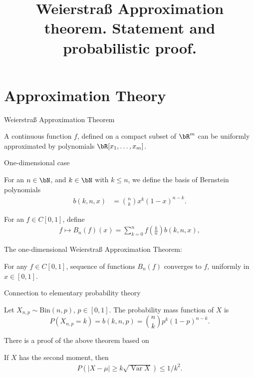 \title{Weierstraß Approximation theorem. Statement and probabilistic proof.}

{
    \begin{frame}
        \titlepage
    \end{frame}
    \addtocounter{framenumber}{-1}
}

\section{Approximation Theory}

\begin{frame}
    {Weierstraß Approximation Theorem}

\begin{theorem}
    A continuous function $f$, defined on a compact subset of $\bR^{m}$ can be
    uniformly approximated by polynomials $\bR[x_1,\dots ,x_{m}]$.
\end{theorem}

\end{frame}

\begin{frame}
    {One-dimensional case}
    
    For an $n\in \bN$, and $k\in \bN$ with $k\leq n$, we define the basis of
    Bernstein polynomials
    \begin{align*}
        b(k,n,x) &= \binom{n}{k} x^{k} (1-x)^{n-k}.
    \end{align*}

    For an $f \in C[0,1]$, define
    \begin{align*}
        f \mapsto B_{n}(f)(x) = \sum_{k=0}^{n} f\left(\frac{k}{n} \right) b(k,n,x), 
    \end{align*}

    The one-dimensional Weierstraß Approximation Theorem: 
    \begin{theorem}
        For any $f \in C[0,1]$, sequence of functions $B_{n}(f)$ converges to $f$,
        uniformly in $x\in [0,1]$.
    \end{theorem}

\end{frame}

\begin{frame}
    {Connection to elementary probability theory}
   
    Let $X_{n,p} \sim \text{Bin}(n,p)$, $p\in [0,1]$. The probability mass function of $X$ is
    \begin{equation*}
        P(X_{n,p} = k) = b(k,n,p) = \binom{n}{k} p^{k} (1-p)^{n-k}. 
    \end{equation*}

    There is a proof of the above theorem based on 
    \begin{theorem}
        If $X$ has the second moment, then 
        \begin{align*}
            P ( | X - \mu  | \geq k \sqrt{ \operatorname{Var} X}  ) \leq 1/k^2. 
        \end{align*}
    \end{theorem}
\end{frame}

